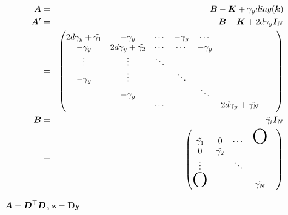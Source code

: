 \documentclass[platex, a4paper]{jsarticle}
\begin{document}
\begin{eqnarray}
  \bm{A} &=& \bm{B} - \bm{K} + \gamma_y diag(\bm{k})\\
  \bm{A'} &=& \bm{B} - \bm{K} + 2d\gamma_y\bm{I}_{N} \\
   &=&\begin{pmatrix}
  2d\gamma_y + \tilde{\gamma_1} & -\gamma_y   & \cdots & -\gamma_y   & \cdots &\\
  -\gamma_y & 2d\gamma_y + \tilde{\gamma_2} &\cdots &  \cdots &  -\gamma_y  &  \\
  \vdots&\vdots& \ddots &&& \\
  -\gamma_y &\vdots&& \ddots &&& \\
  &-\gamma_y&&& \ddots &&& \\
  &&\cdots&&& 2d\gamma_y + \tilde{\gamma_N} \\
  \end{pmatrix} \\
  \bm{B} &=& \tilde {\gamma_i} \bm{I}_{N} \\
    &=& \begin{pmatrix}
      \tilde{\gamma_1} & 0 & \cdots & \mbox{\Huge O}\\
      0 & \tilde{\gamma_2} & && \\
      \vdots & & \ddots \\
      \mbox{\Huge O}&&& \tilde{\gamma_N}
  \end{pmatrix}
\end{eqnarray}




$\bm{A}=\bm{D}^{\top} \bm{D}$, $\bm{z}=\bm{D}\bm{y}$
\end{document}
